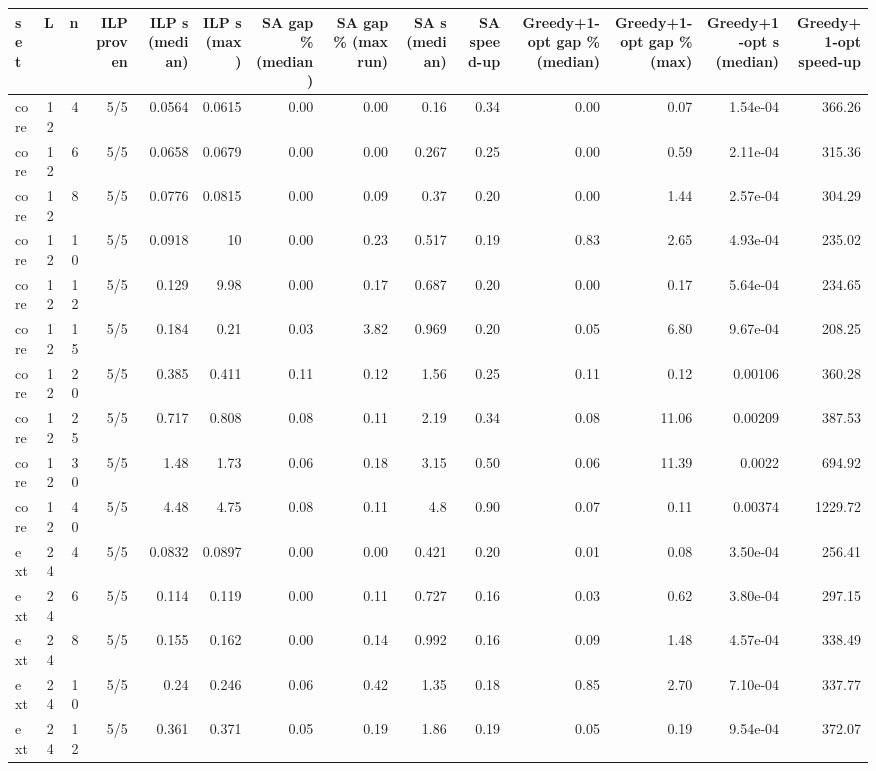 \begin{table}[t]
\centering
\small
\begin{tabular}{lrrrrrrrrrrrrr}
\toprule
set & L & n & ILP proven & ILP s (median) & ILP s (max) & SA gap \% (median) & SA gap \% (max run) & SA s (median) & SA speed-up & Greedy+1-opt gap \% (median) & Greedy+1-opt gap \% (max) & Greedy+1-opt s (median) & Greedy+1-opt speed-up \\
\midrule
core & 12 & 4 & 5/5 & 0.0564 & 0.0615 & 0.00 & 0.00 & 0.16 & 0.34 & 0.00 & 0.07 & 1.54e-04 & 366.26 \\
core & 12 & 6 & 5/5 & 0.0658 & 0.0679 & 0.00 & 0.00 & 0.267 & 0.25 & 0.00 & 0.59 & 2.11e-04 & 315.36 \\
core & 12 & 8 & 5/5 & 0.0776 & 0.0815 & 0.00 & 0.09 & 0.37 & 0.20 & 0.00 & 1.44 & 2.57e-04 & 304.29 \\
core & 12 & 10 & 5/5 & 0.0918 & 10 & 0.00 & 0.23 & 0.517 & 0.19 & 0.83 & 2.65 & 4.93e-04 & 235.02 \\
core & 12 & 12 & 5/5 & 0.129 & 9.98 & 0.00 & 0.17 & 0.687 & 0.20 & 0.00 & 0.17 & 5.64e-04 & 234.65 \\
core & 12 & 15 & 5/5 & 0.184 & 0.21 & 0.03 & 3.82 & 0.969 & 0.20 & 0.05 & 6.80 & 9.67e-04 & 208.25 \\
core & 12 & 20 & 5/5 & 0.385 & 0.411 & 0.11 & 0.12 & 1.56 & 0.25 & 0.11 & 0.12 & 0.00106 & 360.28 \\
core & 12 & 25 & 5/5 & 0.717 & 0.808 & 0.08 & 0.11 & 2.19 & 0.34 & 0.08 & 11.06 & 0.00209 & 387.53 \\
core & 12 & 30 & 5/5 & 1.48 & 1.73 & 0.06 & 0.18 & 3.15 & 0.50 & 0.06 & 11.39 & 0.0022 & 694.92 \\
core & 12 & 40 & 5/5 & 4.48 & 4.75 & 0.08 & 0.11 & 4.8 & 0.90 & 0.07 & 0.11 & 0.00374 & 1229.72 \\
ext & 24 & 4 & 5/5 & 0.0832 & 0.0897 & 0.00 & 0.00 & 0.421 & 0.20 & 0.01 & 0.08 & 3.50e-04 & 256.41 \\
ext & 24 & 6 & 5/5 & 0.114 & 0.119 & 0.00 & 0.11 & 0.727 & 0.16 & 0.03 & 0.62 & 3.80e-04 & 297.15 \\
ext & 24 & 8 & 5/5 & 0.155 & 0.162 & 0.00 & 0.14 & 0.992 & 0.16 & 0.09 & 1.48 & 4.57e-04 & 338.49 \\
ext & 24 & 10 & 5/5 & 0.24 & 0.246 & 0.06 & 0.42 & 1.35 & 0.18 & 0.85 & 2.70 & 7.10e-04 & 337.77 \\
ext & 24 & 12 & 5/5 & 0.361 & 0.371 & 0.05 & 0.19 & 1.86 & 0.19 & 0.05 & 0.19 & 9.54e-04 & 372.07 \\

\end{tabular}
\end{table}
